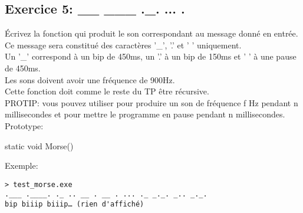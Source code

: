 \subsection{Exercice 5: \_\_ \_\_\_ .\_. ... .}

Écrivez la fonction  qui produit le son correspondant au message donné en
entrée.\\
Ce message sera constitué des caractères '\_', '.' et ' ' uniquement.\\
Un '\_' correspond à un bip de 450ms, un '.' à un bip de 150ms et ' ' à une pause
de 450ms.\\
Les sons doivent avoir une fréquence de 900Hz.\\
Cette fonction doit comme le reste du TP être récursive.\\
PROTIP: vous pouvez utiliser  pour produire un son de
fréquence f Hz pendant n millisecondes et 
pour mettre le programme en pause pendant n millisecondes.\\

Prototype:
\begin{code}
static void Morse()
\end{code}

Exemple:
\begin{verbatim}
> test_morse.exe
.___ .____. ._ .. __ . __ . ... ._ _._. _.. _._.
bip biiip biiip… (rien d'affiché)
\end{verbatim}
